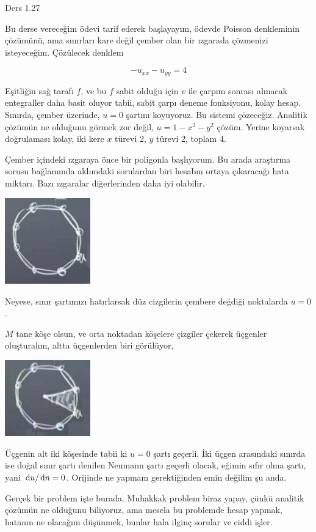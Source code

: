 \documentclass[12pt,fleqn]{article}\usepackage{../../common}
\begin{document}
Ders 1.27

Bu derse vereceğim ödevi tarif ederek başlayayım, ödevde Poisson denkleminin
çözümünü, ama sınırları kare değil çember olan bir ızgarada çözmenizi
isteyeceğim. Çözülecek denklem

$$
-u_{xx} - u_{yy} = 4
$$

Eşitliğin sağ tarafı $f$, ve bu $f$ sabit olduğu için $v$ ile çarpım sonrası
alınacak entegraller daha basit oluyor tabii, sabit çarpı deneme fonksiyonu,
kolay hesap.  Sınırda, çember üzerinde, $u = 0$ şartını koyuyoruz. Bu sistemi
çözeceğiz. Analitik çözümün ne olduğunu görmek zor değil, $u = 1 - x^2 - y^2$
çözüm.  Yerine koyarsak doğrulaması kolay, iki kere $x$ türevi 2, $y$ türevi 2,
toplam 4.

Çember içindeki ızgaraya önce bir poligonla başlıyorum. Bu arada araştırma
sorusu bağlamında aklımdaki sorulardan biri hesabın ortaya çıkaracağı hata
miktarı. Bazı ızgaralar diğerlerinden daha iyi olabilir.

\includegraphics[width=10em]{compscieng_1_27_01.png}

Neyese, sınır şartımızı hatırlarsak düz cizgilerin çembere değdiği noktalarda
$u = 0$.

$M$ tane köşe olsun, ve orta noktadan köşelere çizgiler çekerek üçgenler
oluşturalım, altta üçgenlerden biri görülüyor,

\includegraphics[width=10em]{compscieng_1_27_02.png}

Üçgenin alt iki köşesinde tabii ki $u = 0$ şartı geçerli. İki üçgen arasındaki
sınırda ise doğal sınır şartı denilen Neumann şartı geçerli olacak, eğimin
sıfır olma şartı, yani $\,\mathrm{d} u / \,\mathrm{d} n = 0$. Orijinde ne yapmam gerektiğinden
emin değilim şu anda. 

Gerçek bir problem işte burada. Muhakkak problem biraz yapay, çünkü analitik
çözümün ne olduğunu biliyoruz, ama mesela bu problemde hesap yapmak, hatanın
ne olacağını düşünmek, bunlar hala ilginç sorular ve ciddi işler. 
\end{document}
